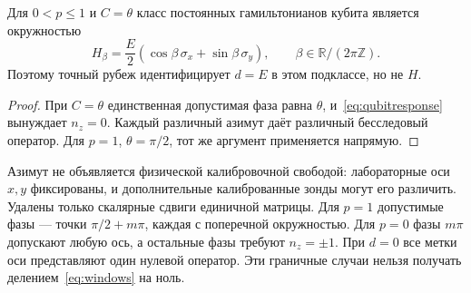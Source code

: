 \begin{corollary}\label{cor:circle}
{Для $0<p\leq1$ и $C=\theta$ класс постоянных гамильтонианов кубита является окружностью}
\begin{equation}\label{eq:circle}
 H_\beta=\frac E2(\cos\beta\,\sigma_x+\sin\beta\,\sigma_y),
 \qquad \beta\in\mathbb R/(2\pi\mathbb Z).
\end{equation}
{Поэтому точный рубеж идентифицирует $d=E$ в этом подклассе, но не $H$.}
\end{corollary}
\begin{proof}
{При $C=\theta$ единственная допустимая фаза равна $\theta$, и~\eqref{eq:qubitresponse} вынуждает $n_z=0$. Каждый различный азимут даёт различный бесследовый оператор. Для $p=1$, $\theta=\pi/2$, тот же аргумент применяется напрямую.}
\end{proof}
{Азимут не объявляется физической калибровочной свободой: лабораторные оси $x,y$ фиксированы, и дополнительные калиброванные зонды могут его различить. Удалены только скалярные сдвиги единичной матрицы. Для $p=1$ допустимые фазы --- точки $\pi/2+m\pi$, каждая с поперечной окружностью. Для $p=0$ фазы $m\pi$ допускают любую ось, а остальные фазы требуют $n_z=\pm1$. При $d=0$ все метки оси представляют один нулевой оператор. Эти граничные случаи нельзя получать делением~\eqref{eq:windows} на ноль.}

